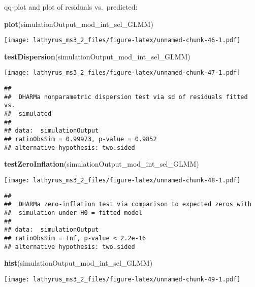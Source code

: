 \documentclass[
]{article}
\newenvironment{Shaded}{\begin{snugshade}}{\end{snugshade}}
\newcommand{\KeywordTok}[1]{\textcolor[rgb]{0.13,0.29,0.53}{\textbf{#1}}}
\newcommand{\NormalTok}[1]{#1}
\begin{document}
qq-plot and plot of residuals vs.~predicted:

\begin{Shaded}
\begin{Highlighting}[]
\KeywordTok{plot}\NormalTok{(simulationOutput_mod_int_sel_GLMM)}
\end{Highlighting}
\end{Shaded}

\texttt{[image: lathyrus\_ms3\_2\_files/figure-latex/unnamed-chunk-46-1.pdf]}

\begin{Shaded}
\begin{Highlighting}[]
\KeywordTok{testDispersion}\NormalTok{(simulationOutput_mod_int_sel_GLMM)}
\end{Highlighting}
\end{Shaded}

\texttt{[image: lathyrus\_ms3\_2\_files/figure-latex/unnamed-chunk-47-1.pdf]}

\begin{verbatim}
## 
##  DHARMa nonparametric dispersion test via sd of residuals fitted vs.
##  simulated
## 
## data:  simulationOutput
## ratioObsSim = 0.99973, p-value = 0.9852
## alternative hypothesis: two.sided
\end{verbatim}

\begin{Shaded}
\begin{Highlighting}[]
\KeywordTok{testZeroInflation}\NormalTok{(simulationOutput_mod_int_sel_GLMM)}
\end{Highlighting}
\end{Shaded}

\texttt{[image: lathyrus\_ms3\_2\_files/figure-latex/unnamed-chunk-48-1.pdf]}

\begin{verbatim}
## 
##  DHARMa zero-inflation test via comparison to expected zeros with
##  simulation under H0 = fitted model
## 
## data:  simulationOutput
## ratioObsSim = Inf, p-value < 2.2e-16
## alternative hypothesis: two.sided
\end{verbatim}

\begin{Shaded}
\begin{Highlighting}[]
\KeywordTok{hist}\NormalTok{(simulationOutput_mod_int_sel_GLMM)}
\end{Highlighting}
\end{Shaded}

\texttt{[image: lathyrus\_ms3\_2\_files/figure-latex/unnamed-chunk-49-1.pdf]}
\end{document}
